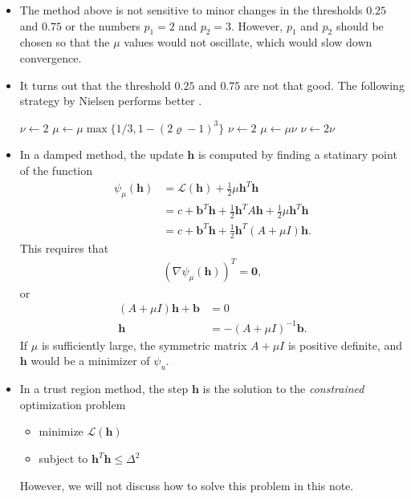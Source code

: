 \documentclass[10pt]{article}
\newcommand{\ve}[1]{\mathbf{#1}}
\newcommand{\mcal}[1]{\mathcal{#1}}
\begin{document}
\begin{itemize}
    \item The method above is not sensitive to minor changes in the thresholds $0.25$ and $0.75$ or the numbers $p_1 = 2$ and $p_2 = 3$. However, $p_1$ and $p_2$ should be chosen so that the $\mu$ values would not oscillate, which would slow down convergence.
    
    \pagebreak
    
    \item It turns out that the threshold $0.25$ and $0.75$ are not that good. The following strategy by Nielsen performs better \cite{Nielsen:1999}.
    \begin{algorithmic}
        \State $\nu \gets 2$
            \State $\mu \gets \mu \max\{ 1/3, 1 - (2\varrho-1)^3\}$
            \State $\nu \gets 2$
        \Else
            \State $\mu \gets \mu \nu$
            \State $\nu \gets 2\nu$
        \EndIf
    \end{algorithmic}

    \item In a damped method, the update $\ve{h}$ is computed by finding a statinary point of the function
    \begin{align*}
        \psi_\mu(\ve{h}) 
        &= \mcal{L}(\ve{h}) + \frac{1}{2}\mu\ve{h}^T\ve{h} \\
        &= c + \ve{b}^T \ve{h} + \frac{1}{2} \ve{h}^T A \ve{h} + \frac{1}{2}\mu \ve{h}^T \ve{h} \\
        &= c + \ve{b}^T \ve{h} + \frac{1}{2} \ve{h}^T (A + \mu I) \ve{h}.
    \end{align*}
    This requires that
    \begin{align*}
        (\nabla \psi_\mu(\ve{h}))^T = \ve{0},        
    \end{align*}
    or
    \begin{align*}
        (A + \mu I)\ve{h} + \ve{b} &= 0 \\
        \ve{h} &= -(A + \mu I)^{-1} \ve{b}.
    \end{align*}
    If $\mu$ is sufficiently large, the symmetric matrix $A + \mu I$ is positive definite, and $\ve{h}$ would be a minimizer of $\psi_u$.

    \item In a trust region method, the step $\ve{h}$ is the solution to the \emph{constrained} optimization problem
    \begin{itemize}
        \item[] minimize $\mathcal{L}(\ve{h})$
        \item[] subject to $\ve{h}^T\ve{h} \leq \Delta^2$
    \end{itemize}
    However, we will not discuss how to solve this problem in this note.
\end{itemize}
\end{document}
